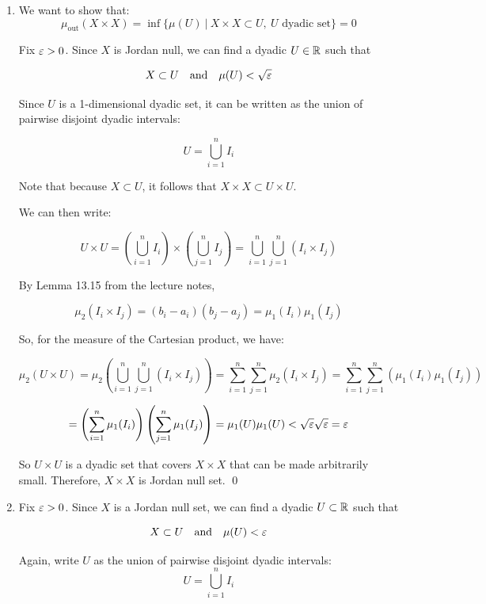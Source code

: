 \documentclass[12pt]{article}
\begin{document}
\begin{enumerate}[label=\alph*)]
    \item We want to show that:
    $$
        \mu_{\text{out}}(X \times X) = \inf \{\mu(U) \ |\ X \times X \subset U,\ U \text{ dyadic set}\} = 0
    $$

    Fix $\varepsilon > 0$. Since $X$ is Jordan null, we can find a dyadic $U \in \mathbb{R}$ such that

    $$
        X \subset U \quad \text{and} \quad \mu(U) < \sqrt{\varepsilon}
    $$

    Since $U$ is a 1-dimensional dyadic set, it can be written as the union of pairwise disjoint dyadic intervals:

    $$
        U = \bigcup\limits_{i = 1}^{n} I_i
    $$

    Note that because $X \subset U$, it follows that $X \times X \subset U \times U$.

    We can then write:

    $$
        U \times U = \left(\bigcup\limits_{i = 1}^{n} I_i\right) \times \left(\bigcup\limits_{j = 1}^{n} I_j\right) = \bigcup\limits_{i = 1}^n \bigcup\limits_{j = 1}^n \left(I_i \times I_j \right)
    $$

    By Lemma 13.15 from the lecture notes,

    $$
        \mu_2(I_i \times I_j) = (b_i - a_i)(b_j - a_j) = \mu_1(I_i) \mu_1(I_j)
    $$

    So, for the measure of the Cartesian product, we have:

    $$
        \mu_2(U \times U) = \mu_2\left(\bigcup\limits_{i = 1}^n \bigcup\limits_{j = 1}^n \left(I_i \times I_j \right)\right) = \sum_{i = 1}^n \sum_{j = 1}^n \mu_2\left(I_i \times I_j \right) = \sum_{i = 1}^n \sum_{j = 1}^n \left( \mu_1(I_i) \mu_1(I_j) \right)
    $$

    $$
        = \left( \sum_{i = 1}^{n} \mu_1(I_i) \right) \left( \sum_{j = 1}^{n} \mu_1(I_j) \right) = \mu_1(U) \mu_1(U) < \sqrt{\varepsilon}\sqrt{\varepsilon} = \varepsilon
    $$

    So $U \times U$ is a dyadic set that covers $X \times X$ that can be made arbitrarily small. Therefore, $X \times X$ is Jordan null set. \qed


    \item Fix $\varepsilon > 0$. Since $X$ is a Jordan null set, we can find a dyadic $U \subset \mathbb{R}$ such that
    
    $$
        X \subset U \quad \text{and} \quad \mu(U) < \varepsilon 
    $$

    Again, write $U$ as the union of pairwise disjoint dyadic intervals:
    $$
        U = \bigcup\limits_{i = 1}^{n} I_i
    $$


\end{enumerate}
\end{document}
